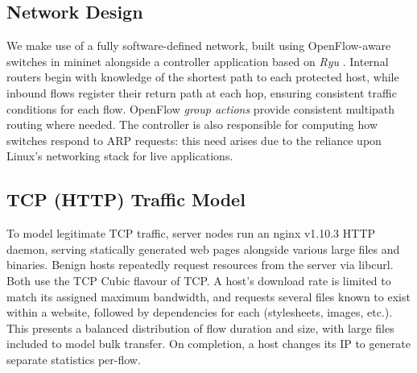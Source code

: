 \documentclass[10pt, times, conference, letterpaper]{IEEEtran}
\begin{document}
\subsection{Network Design}
We make use of a fully software-defined network, built using OpenFlow-aware switches in mininet alongside a controller application based on \emph{Ryu} \cite{ryu}.
Internal routers begin with knowledge of the shortest path to each protected host, while inbound flows register their return path at each hop, ensuring consistent traffic conditions for each flow.
OpenFlow \emph{group actions} provide consistent multipath routing where needed. 
The controller is also responsible for computing how switches respond to ARP requests: this need arises due to the reliance upon Linux's networking stack for live applications.

\subsection{TCP (HTTP) Traffic Model}
To model legitimate TCP traffic, server nodes run an nginx v1.10.3 HTTP daemon, serving statically generated web pages alongside various large files and binaries.
Benign hosts repeatedly request resources from the server via libcurl.
Both use the TCP Cubic \cite{rfc8312} flavour of TCP.
A host's download rate is limited to match its assigned maximum bandwidth, and requests several files known to exist within a website, followed by dependencies for each (stylesheets, images, etc.).
This presents a balanced distribution of flow duration and size, with large files included to model bulk transfer.
On completion, a host changes its IP to generate separate statistics per-flow.
\end{document}
